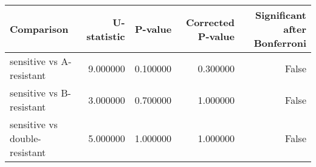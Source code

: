 \begin{tabular}{lrrrr}
\toprule
Comparison & U-statistic & P-value & Corrected P-value & Significant after Bonferroni \\
\midrule
sensitive vs A-resistant & 9.000000 & 0.100000 & 0.300000 & False \\
sensitive vs B-resistant & 3.000000 & 0.700000 & 1.000000 & False \\
sensitive vs double-resistant & 5.000000 & 1.000000 & 1.000000 & False \\
\bottomrule
\end{tabular}
